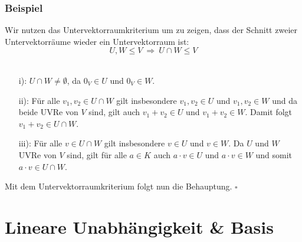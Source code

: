 %
%
\begin{frame}\frametitle{Beispiel}
Wir nutzen das Untervektorraumkriterium um zu zeigen, dass der Schnitt zweier Untervektorräume wieder ein Untervektorraum ist:
$$
U,W \le V \ \Longrightarrow \ U \cap W \le V
$$
\\ \pause
\begin{itemize}
\item[i):] $U \cap W \ne \emptyset$, da $0_V \in U$ und $0_V \in W$. \pause
\item[ii):] Für alle $v_1,v_2 \in U \cap W$ gilt insbesondere $v_1,v_2 \in U$ und $v_1,v_2 \in W$ und da beide UVRe von $V$ sind, gilt auch $v_1+v_2 \in U$ und $v_1+v_2 \in W$. Damit folgt $v_1+v_2 \in U \cap W$. \pause
\item[iii):] Für alle $v \in U\cap W$ gilt insbesondere $v\in U$ und $v \in W$. Da $U$ und $W$ UVRe von $V$ sind, gilt für alle $a \in K$ auch $a\cdot v \in U$ und $a \cdot v \in W$ und somit $a\cdot v \in U \cap W$.
\end{itemize}\pause
Mit dem Untervektorraumkriterium folgt nun die Behauptung. \hfill $\square$
\end{frame}
%
%
\section{Lineare Unabhängigkeit \& Basis}
\makeSectionDividerPage
